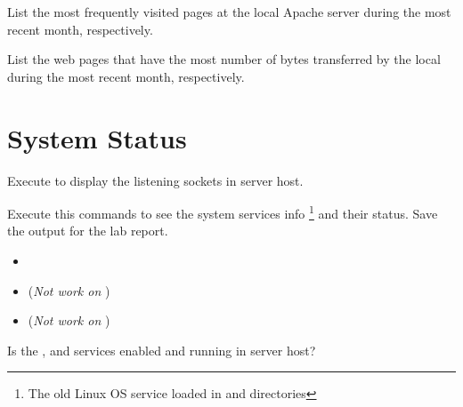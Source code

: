 \documentclass{../UTNetLab}
\begin{document}
    \begin{report}
        \item List the most frequently visited pages at the local Apache server during the most recent month, respectively.
        
        \item List the web pages that have the most number of bytes transferred by the local during the most recent month, respectively.
    \end{report}

\section{System Status}
    Execute  to display the listening sockets in server host.

    Execute this commands to see the system services info \footnote{The old Linux OS service loaded in and  directories} and their status.
    Save the output for the lab report.
    \begin{itemize}
        \item {}
        \item {} (\textit{Not work on} )
        \item {} (\textit{Not work on} )
    \end{itemize}
    
    \begin{report}
        \item Is the ,  and  services enabled and running in server host?
    \end{report}
\end{document}
